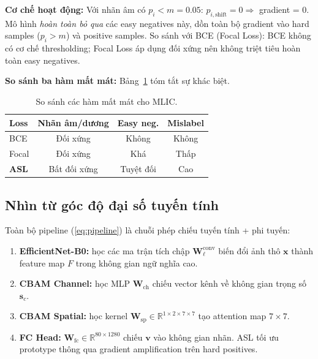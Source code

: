 \documentclass[conference]{IEEEtran}
\begin{document}
\textbf{Cơ chế hoạt động:}
Với nhãn âm có $p_i < m = 0.05$: $p_{i,\text{shift}} = 0 \Rightarrow$ gradient = 0.
Mô hình \textit{hoàn toàn bỏ qua} các easy negatives này,
dồn toàn bộ gradient vào hard samples ($p_i > m$) và positive samples.
So sánh với BCE (Focal Loss): BCE không có cơ chế thresholding;
Focal Loss áp dụng đối xứng nên không triệt tiêu hoàn toàn easy negatives.

\textbf{So sánh ba hàm mất mát:}
Bảng~\ref{tab:loss_compare} tóm tắt sự khác biệt.

\begin{table}[t]
  \caption{So sánh các hàm mất mát cho MLIC.}
  \label{tab:loss_compare}
  \centering
  \begin{tabular}{lccc}
    \toprule
    \textbf{Loss} & \textbf{Nhãn âm/dương} & \textbf{Easy neg.} & \textbf{Mislabel} \\
    \midrule
    BCE \cite{goodfellow2016deep}     & Đối xứng   & Không & Không \\
    Focal \cite{lin2017focal}         & Đối xứng   & Khá   & Thấp  \\
    \textbf{ASL \cite{ridnik2021asl}} & Bất đối xứng & Tuyệt đối & Cao \\
    \bottomrule
  \end{tabular}
\end{table}

\subsection{Nhìn từ góc độ đại số tuyến tính}

Toàn bộ pipeline (\ref{eq:pipeline}) là chuỗi phép chiếu tuyến tính + phi tuyến:

\begin{enumerate}[leftmargin=1.8em]
  \item \textbf{EfficientNet-B0:} học các ma trận tích chập $\mathbf{W}_\ell^{\text{conv}}$
        biến đổi ảnh thô $\mathbf{x}$ thành feature map $F$ trong không gian ngữ nghĩa cao.
  \item \textbf{CBAM Channel:} học MLP $\mathbf{W}_{\text{ch}}$ chiếu vector kênh
        về không gian trọng số $\mathbf{s}_c$.
  \item \textbf{CBAM Spatial:} học kernel $\mathbf{W}_{\text{sp}} \in \mathbb{R}^{1\times2\times7\times7}$
        tạo attention map $7 \times 7$.
  \item \textbf{FC Head:} $\mathbf{W}_{\text{fc}} \in \mathbb{R}^{80 \times 1280}$
        chiếu $\mathbf{v}$ vào không gian nhãn.
        ASL tối ưu prototype thông qua gradient amplification trên hard positives.
\end{enumerate}
\end{document}
